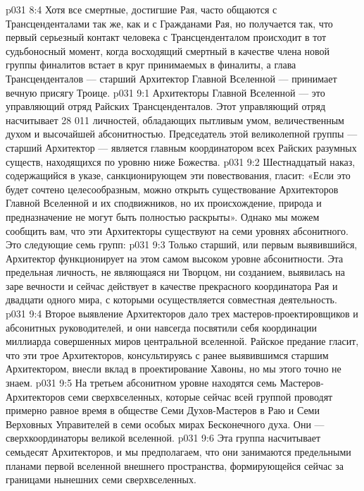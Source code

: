 \vs p031 8:4 Хотя все смертные, достигшие Рая, часто общаются с Трансценденталами так же, как и с Гражданами Рая, но получается так, что первый серьезный контакт человека с Трансценденталом происходит в тот судьбоносный момент, когда восходящий смертный в качестве члена новой группы финалитов встает в круг принимаемых в финалиты, а глава Трансценденталов --- старший Архитектор Главной Вселенной --- принимает вечную присягу Троице.
\vs p031 9:1 Архитекторы Главной Вселенной --- это управляющий отряд Райских Трансценденталов. Этот управляющий отряд насчитывает 28 011 личностей, обладающих пытливым умом, величественным духом и высочайшей абсонитностью. Председатель этой великолепной группы --- старший Архитектор --- является главным координатором всех Райских разумных существ, находящихся по уровню ниже Божества.
\vs p031 9:2 Шестнадцатый наказ, содержащийся в указе, санкционирующем эти повествования, гласит: «Если это будет сочтено целесообразным, можно открыть существование Архитекторов Главной Вселенной и их сподвижников, но их происхождение, природа и предназначение не могут быть полностью раскрыты». Однако мы можем сообщить вам, что эти Архитекторы существуют на семи уровнях абсонитного. Это следующие семь групп:
\vs p031 9:3 \bibnobreakspace {} Только старший, или первым выявившийся, Архитектор функционирует на этом самом высоком уровне абсонитности. Эта предельная личность, не являющаяся ни Творцом, ни созданием, выявилась на заре вечности и сейчас действует в качестве прекрасного координатора Рая и двадцати одного мира, с которыми осуществляется совместная деятельность.
\vs p031 9:4 \pc {}\bibnobreakspace {} Второе выявление Архитекторов дало трех мастеров\hyp{}проектировщиков и абсонитных руководителей, и они навсегда посвятили себя координации миллиарда совершенных миров центральной вселенной. Райское предание гласит, что эти трое Архитекторов, консультируясь с ранее выявившимся старшим Архитектором, внесли вклад в проектирование Хавоны, но мы этого точно не знаем.
\vs p031 9:5 \pc {}\bibnobreakspace {} На третьем абсонитном уровне находятся семь Мастеров\hyp{}Архитекторов семи сверхвселенных, которые сейчас всей группой проводят примерно равное время в обществе Семи Духов\hyp{}Мастеров в Раю и Семи Верховных Управителей в семи особых мирах Бесконечного духа. Они --- сверхкоординаторы великой вселенной.
\vs p031 9:6 \pc {}\bibnobreakspace {} Эта группа насчитывает семьдесят Архитекторов, и мы предполагаем, что они занимаются предельными планами первой вселенной внешнего пространства, формирующейся сейчас за границами нынешних семи сверхвселенных.
